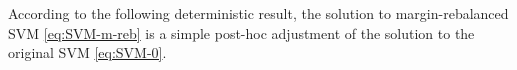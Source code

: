 
According to the following deterministic result, the solution to margin-rebalanced SVM \cref{eq:SVM-m-reb} is a simple post-hoc adjustment of the solution to the original SVM \cref{eq:SVM-0}.

